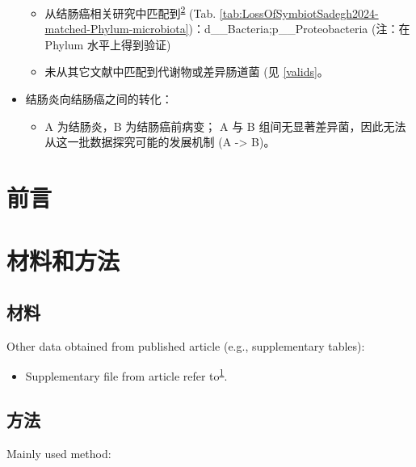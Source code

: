\documentclass[
]{article}
\providecommand{\tightlist}{%
  \setlength{\itemsep}{0pt}\setlength{\parskip}{0pt}}
\begin{document}
\begin{itemize}
  \begin{itemize}
  \tightlist
  \item
    从结肠癌相关研究中匹配到\textsuperscript{\protect\hyperlink{ref-LossOfSymbiotSadegh2024}{2}} (Tab.
    \ref{tab:LossOfSymbiotSadegh2024-matched-Phylum-microbiota})：d\_\_Bacteria;p\_\_Proteobacteria
    (注：在 Phylum 水平上得到验证)
  \item
    未从其它文献中匹配到代谢物或差异肠道菌 (见 \ref{valids}。
  \end{itemize}
\item
  结肠炎向结肠癌之间的转化：

  \begin{itemize}
  \tightlist
  \item
    A 为结肠炎，B 为结肠癌前病变； A 与 B 组间无显著差异菌，因此无法从这一批数据探究可能的发展机制 (A -\textgreater{} B)。
  \end{itemize}
\end{itemize}

\hypertarget{introduction}{%
\section{前言}\label{introduction}}

\hypertarget{methods}{%
\section{材料和方法}\label{methods}}

\hypertarget{ux6750ux6599}{%
\subsection{材料}\label{ux6750ux6599}}

Other data obtained from published article (e.g., supplementary tables):

\begin{itemize}
\tightlist
\item
  Supplementary file from article refer to\textsuperscript{\protect\hyperlink{ref-MendelianRandoLiuX2022}{1}}.
\end{itemize}

\hypertarget{ux65b9ux6cd5}{%
\subsection{方法}\label{ux65b9ux6cd5}}

Mainly used method:
\end{document}
